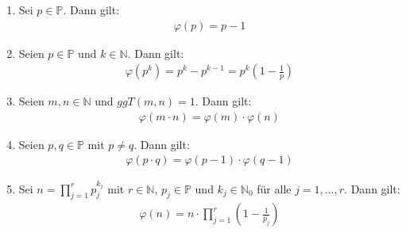 \begin{enumerate}
    \item Sei $p\in \mathbb{P}$.
    Dann gilt:
    \begin{align*}
        \varphi(p)=p-1
    \end{align*}
    \item Seien $p\in \mathbb{P}$ und $k \in \mathbb{N}$.
    Dann gilt:
    \begin{align*}
        \varphi(p^k)=p^k-p^{k-1}=p^k(1-\frac{1}{p})
    \end{align*}
    \item Seien $m,n\in \mathbb{N}$ und $ggT(m,n)=1$.
    Dann gilt:
    \begin{align*}
        \varphi(m\cdot n)=\varphi(m)\cdot \varphi(n)
    \end{align*}
    \item Seien $p,q\in \mathbb{P}$ mit $p\neq q$.
    Dann gilt:
    \begin{align*}
        \varphi(p\cdot q)=\varphi(p-1)\cdot \varphi(q-1)
    \end{align*}
    \item Sei $n=\prod_{j=1}^{r}p_j^{k_{j}}$ mit $r\in \mathbb{N}$, $p_j\in\mathbb{P}$ und $k_j\in \mathbb{N}_0$ für alle $j=1,\dots,r$.
    Dann gilt:
    \begin{align*}
        \varphi(n)=n\cdot \prod_{j=1}^{r}(1-\frac{1}{p_j})
    \end{align*}
\end{enumerate}

